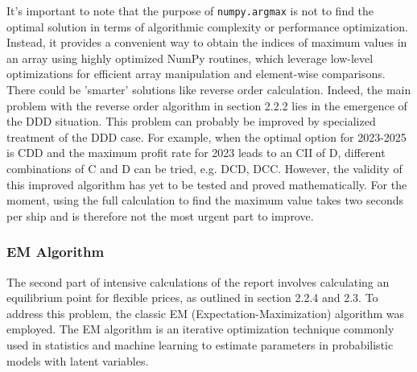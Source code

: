 \documentclass[a4paper,12pt]{article}
\begin{document}
It's important to note that the purpose of \texttt{numpy.argmax} is not to find the optimal solution in terms of algorithmic complexity or performance optimization.
Instead, it provides a convenient way to obtain the indices of maximum values in an array using highly optimized NumPy routines, which leverage low-level optimizations for efficient array manipulation and element-wise comparisons.\\



There could be 'smarter' solutions like reverse order calculation.
Indeed, the main problem with the reverse order algorithm in section 2.2.2 lies in the emergence of the DDD situation. This problem can probably be improved by specialized treatment of the DDD case.
For example, when the optimal option for 2023-2025 is CDD and the maximum profit rate for 2023 leads to an CII of D, different combinations of C and D can be tried, e.g. DCD, DCC. However, the validity of this improved algorithm has yet to be tested and proved mathematically.
For the moment, using the full calculation to find the maximum value takes two seconds per ship and is therefore not the most urgent part to improve.\\


\subsubsection{EM Algorithm}

The second part of intensive calculations of the report involves calculating an equilibrium point for flexible prices, as outlined in section 2.2.4 and 2.3.
To address this problem, the classic EM (Expectation-Maximization) algorithm was employed.
The EM algorithm is an iterative optimization technique commonly used in statistics and machine learning to estimate parameters in probabilistic models with latent variables.\\

\end{document}
